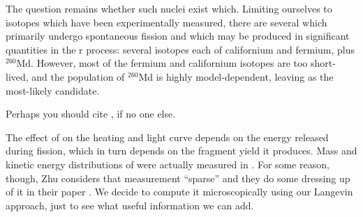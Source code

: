 The question remains whether such nuclei exist which. Limiting ourselves to isotopes which have been experimentally measured, there are several which primarily undergo spontaneous fission and which may be produced in significant quantities in the r process: several isotopes each of californium and fermium, plus $^{260}$Md. However, most of the fermium and californium isotopes are too short-lived, and the population of $^{260}$Md is highly model-dependent, leaving {\Cf} as the most-likely candidate.

Perhaps you should cite \cite{Zhu2018}, if no one else.

The effect of {\Cf} on the heating and light curve depends on the energy released during fission, which in turn depends on the fragment yield it produces. Mass and kinetic energy distributions of {\Cf} were actually measured in \cite{Brandt1963}. For some reason, though, Zhu considers that measurement ``sparse'' and they do some dressing up of it in their paper \cite{Zhu2018}. We decide to compute it microscopically using our Langevin approach, just to see what useful information we can add.



%
%


